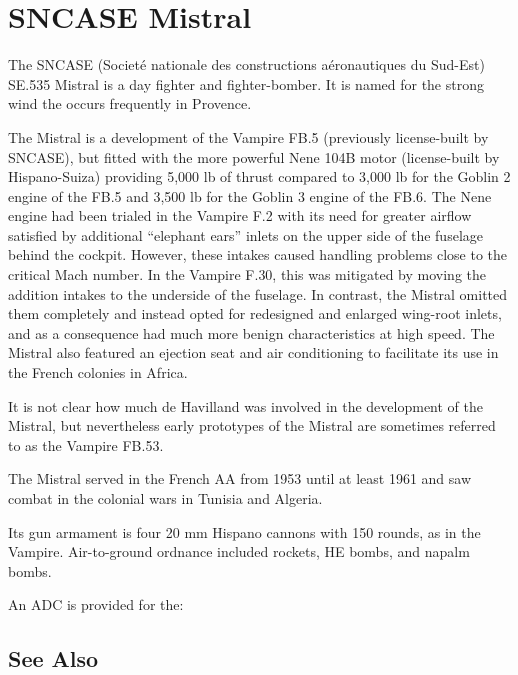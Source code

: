 \section{SNCASE Mistral}

The SNCASE (Societé nationale des constructions aéronautiques du Sud-Est) SE.535 Mistral is a day fighter and fighter-bomber. It is named for the strong wind the occurs frequently in Provence.

The Mistral is a development of the Vampire FB.5 (previously license-built by SNCASE), but fitted with the more powerful Nene 104B motor (license-built by Hispano-Suiza) providing 5,000 lb of thrust compared to 3,000 lb for the Goblin 2 engine of the FB.5 and 3,500 lb for the Goblin 3 engine of the FB.6. The Nene engine had been trialed in the Vampire F.2 with its need for greater airflow satisfied by additional “elephant ears” inlets on the upper side of the fuselage behind the cockpit. However, these intakes caused handling problems close to the critical Mach number. In the Vampire F.30, this was mitigated by moving the addition intakes to the underside of the fuselage. In contrast, the Mistral omitted them completely and instead opted for redesigned and enlarged wing-root inlets, and as a consequence had much more benign characteristics at high speed. The Mistral also featured an ejection seat and air conditioning to facilitate its use in the French colonies in Africa.

It is not clear how much de Havilland was involved in the development of the Mistral, but nevertheless
early prototypes of the Mistral are sometimes referred to as the Vampire FB.53.

The Mistral served in the French AA from 1953 until at least 1961 and saw combat in the colonial wars in Tunisia and Algeria.

Its gun armament is four 20 mm Hispano cannons with 150 rounds, as in the Vampire. Air-to-ground ordnance included rockets, HE bombs, and napalm bombs.

An ADC is provided for the:
\begin{adclist}
\end{adclist}

\subsection{See Also}
\begin{typelist}
\end{typelist}